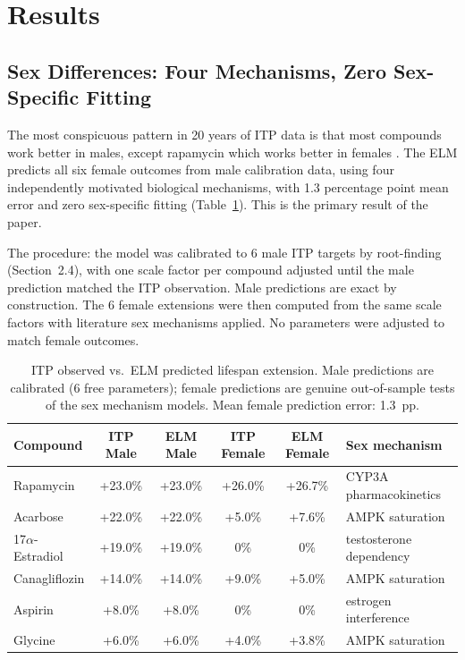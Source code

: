 \documentclass[11pt]{article}
\begin{document}
\section{Results}

\subsection{Sex Differences: Four Mechanisms, Zero Sex-Specific Fitting}

The most conspicuous pattern in 20 years of ITP data is that most compounds work better in males, except rapamycin which works better in females \citep{Jiang2025}. The ELM predicts all six female outcomes from male calibration data, using four independently motivated biological mechanisms, with 1.3 percentage point mean error and zero sex-specific fitting (Table~\ref{tab:calibration}). This is the primary result of the paper.

The procedure: the model was calibrated to 6 male ITP targets by root-finding (Section~2.4), with one scale factor per compound adjusted until the male prediction matched the ITP observation. Male predictions are exact by construction. The 6 female extensions were then computed from the same scale factors with literature sex mechanisms applied. No parameters were adjusted to match female outcomes.

\begin{table}[ht]
\centering
\caption{ITP observed vs.\ ELM predicted lifespan extension. Male predictions are calibrated (6 free parameters); female predictions are genuine out-of-sample tests of the sex mechanism models. Mean female prediction error: 1.3~pp.}
\label{tab:calibration}
\begin{tabular}{@{}lccccl@{}}
\toprule
Compound & ITP Male & ELM Male & ITP Female & ELM Female & Sex mechanism \\
\midrule
Rapamycin      & +23.0\% & +23.0\% & +26.0\% & +26.7\% & CYP3A pharmacokinetics \\
Acarbose       & +22.0\% & +22.0\% & +5.0\%  & +7.6\%  & AMPK saturation \\
17$\alpha$-Estradiol & +19.0\% & +19.0\% & 0\%     & 0\%     & testosterone dependency \\
Canagliflozin  & +14.0\% & +14.0\% & +9.0\%  & +5.0\%  & AMPK saturation \\
Aspirin        & +8.0\%  & +8.0\%  & 0\%     & 0\%     & estrogen interference \\
Glycine        & +6.0\%  & +6.0\%  & +4.0\%  & +3.8\%  & AMPK saturation \\
\bottomrule
\end{tabular}
\end{table}
\end{document}
